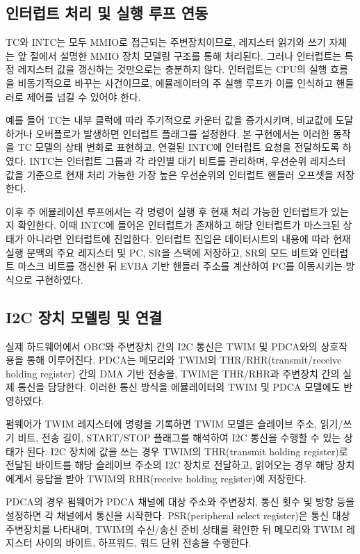 \documentclass[master,korean,final]{kaist-ucs}
\begin{document}
\subsection{인터럽트 처리 및 실행 루프 연동}

TC와 INTC는 모두 MMIO로 접근되는 주변장치이므로, 레지스터 읽기와 쓰기 자체는 앞 절에서 설명한 MMIO 장치 모델링 구조를 통해 처리된다. 그러나 인터럽트는 특정 레지스터 값을 갱신하는 것만으로는 충분하지 않다. 인터럽트는 CPU의 실행 흐름을 비동기적으로 바꾸는 사건이므로, 에뮬레이터의 주 실행 루프가 이를 인식하고 핸들러로 제어를 넘길 수 있어야 한다.

예를 들어 TC는 내부 클럭에 따라 주기적으로 카운터 값을 증가시키며, 비교값에 도달하거나 오버플로가 발생하면 인터럽트 플래그를 설정한다. 본 구현에서는 이러한 동작을 TC 모델의 상태 변화로 표현하고, 연결된 INTC에 인터럽트 요청을 전달하도록 하였다. INTC는 인터럽트 그룹과 각 라인별 대기 비트를 관리하며, 우선순위 레지스터 값을 기준으로 현재 처리 가능한 가장 높은 우선순위의 인터럽트 핸들러 오프셋을 저장한다.

이후 주 에뮬레이션 루프에서는 각 명령어 실행 후 현재 처리 가능한 인터럽트가 있는지 확인한다. 이때 INTC에 들어온 인터럽트가 존재하고 해당 인터럽트가 마스크된 상태가 아니라면 인터럽트에 진입한다. 인터럽트 진입은 데이터시트의 내용에 따라 현재 실행 문맥의 주요 레지스터 및 PC, SR을 스택에 저장하고, SR의 모드 비트와 인터럽트 마스크 비트를 갱신한 뒤 EVBA 기반 핸들러 주소를 계산하여 PC를 이동시키는 방식으로 구현하였다.

\subsection{I2C 장치 모델링 및 연결}

실제 하드웨어에서 OBC와 주변장치 간의 I2C 통신은 TWIM 및 PDCA와의 상호작용을 통해 이루어진다. PDCA는 메모리와 TWIM의 THR/RHR(transmit/receive holding register) 간의 DMA 기반 전송을, TWIM은 THR/RHR과 주변장치 간의 실제 통신을 담당한다. 이러한 통신 방식을 에뮬레이터의 TWIM 및 PDCA 모델에도 반영하였다.

펌웨어가 TWIM 레지스터에 명령을 기록하면 TWIM 모델은 슬레이브 주소, 읽기/쓰기 비트, 전송 길이, START/STOP 플래그를 해석하여 I2C 통신을 수행할 수 있는 상태가 된다. I2C 장치에 값을 쓰는 경우 TWIM의 THR(transmit holding register)로 전달된 바이트를 해당 슬레이브 주소의 I2C 장치로 전달하고, 읽어오는 경우 해당 장치에게서 응답을 받아 TWIM의 RHR(receive holding register)에 저장한다.

PDCA의 경우 펌웨어가 PDCA 채널에 대상 주소와 주변장치, 통신 횟수 및 방향 등을 설정하면 각 채널에서 통신을 시작한다. PSR(peripheral select register)은 통신 대상 주변장치를 나타내며, TWIM의 수신/송신 준비 상태를 확인한 뒤 메모리와 TWIM 레지스터 사이의 바이트, 하프워드, 워드 단위 전송을 수행한다.
\end{document}
